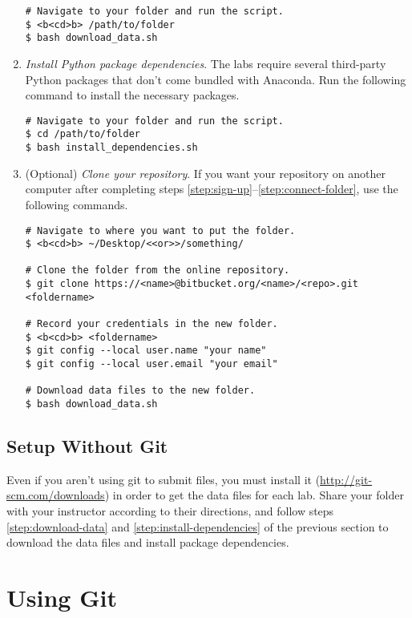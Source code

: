 \begin{enumerate}
\begin{lstlisting}
# Navigate to your folder and run the script.
$ <b<cd>b> /path/to/folder
$ bash download_data.sh
\end{lstlisting}

\item \emph{Install Python package dependencies}.
\label{step:install-dependencies}
The labs require several third-party Python packages that don't come bundled with Anaconda.
Run the following command to install the necessary packages.
\begin{lstlisting}
# Navigate to your folder and run the script.
$ cd /path/to/folder
$ bash install_dependencies.sh
\end{lstlisting}

\item (Optional) \emph{Clone your repository}.
If you want your repository on another computer after completing steps \ref{step:sign-up}--\ref{step:connect-folder}, use the following commands.

\begin{lstlisting}
# Navigate to where you want to put the folder.
$ <b<cd>b> ~/Desktop/<<or>>/something/

# Clone the folder from the online repository.
$ git clone https://<name>@bitbucket.org/<name>/<repo>.git <foldername>

# Record your credentials in the new folder.
$ <b<cd>b> <foldername>
$ git config --local user.name "your name"
$ git config --local user.email "your email"

# Download data files to the new folder.
$ bash download_data.sh
\end{lstlisting}
\end{enumerate}

\subsection*{Setup Without Git} %

Even if you aren't using git to submit files, you must install it (\url{http://git-scm.com/downloads}) in order to get the data files for each lab.
Share your folder with your instructor according to their directions, and follow steps \ref{step:download-data} and \ref{step:install-dependencies} of the previous section to download the data files and install package dependencies.

\section*{Using Git} %

